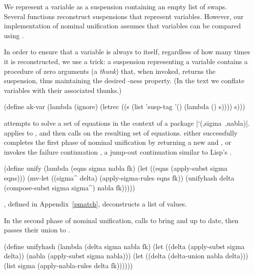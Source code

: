 We represent a variable as a suspension containing an empty
list of swaps.  Several functions reconstruct suspensions that represent
variables.  However, our implementation of nominal unification assumes
that variables can be compared using .

In order to ensure that a variable is always  to itself,
regardless of how many times it is reconstructed, we use a
 trick: a suspension representing a variable
contains a procedure of zero arguments (a \emph{thunk})
that, when invoked, returns the suspension,
thus maintaining the desired -ness property.
(In the text we conflate variables with their associated thunks.)

\schemedisplayspace
\begin{schemedisplay}
(define ak-var
  (lambda (ignore)
    (letrec ((s (list 'susp-tag '() (lambda () s))))
      s)))
\end{schemedisplay}

 attempts to solve a set of equations 
in the context of a package \mbox{\scheme|`(,sigma ,nabla)|}.
 applies  to , 
and then calls  on the resulting 
set of equations.
 either successfully completes the first
phase of nominal unification by returning a new  and
, or invokes the failure continuation ,
a jump-out continuation similar to Lisp's
 \cite{Steele:1990:CLL}.

\schemedisplayspace
\begin{schemedisplay}
(define unify
  (lambda (eqns sigma nabla fk)
    (let ((eqns (apply-subst sigma eqns)))
      (mv-let ((sigma^ delta) (apply-sigma-rules eqns fk))
        (unifyhash delta (compose-subst sigma sigma^) nabla fk)))))
\end{schemedisplay}
\noindent {}, defined in Appendix~\ref{pmatch}, deconstructs a list of values.

In the second phase of nominal unification,  calls 
to bring  and  up to date, then
passes their union to .

\schemedisplayspace
\begin{schemedisplay}
(define unifyhash
  (lambda (delta sigma nabla fk)
    (let ((delta (apply-subst sigma delta))
          (nabla (apply-subst sigma nabla)))
      (let ((delta (delta-union nabla delta)))
        (list sigma (apply-nabla-rules delta fk))))))
\end{schemedisplay}

